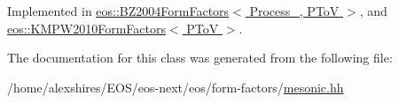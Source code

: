 Implemented in \hyperlink{classeos_1_1BZ2004FormFactors_3_01Process___00_01PToV_01_4_abcc23f51780966652892e0afa138ac3d}{eos::BZ2004FormFactors$<$ Process\_\-, PToV $>$}, and \hyperlink{classeos_1_1KMPW2010FormFactors_3_01PToV_01_4_a18116140dccb14f0be2892051487e39b}{eos::KMPW2010FormFactors$<$ PToV $>$}.

The documentation for this class was generated from the following file:\begin{DoxyCompactItemize}
\item 
/home/alexshires/EOS/eos-\/next/eos/form-\/factors/\hyperlink{mesonic_8hh}{mesonic.hh}\end{DoxyCompactItemize}
